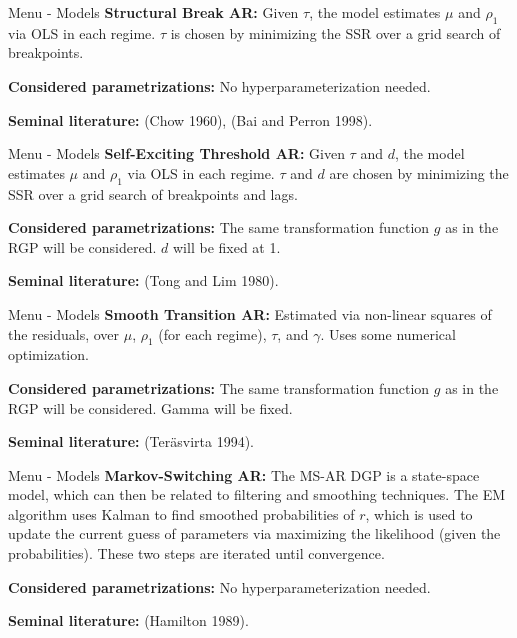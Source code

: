\documentclass[
  ignorenonframetext,
]{beamer}
\begin{document}
\begin{frame}{Menu - Models}
\label{menu---models-1}
\textbf{Structural Break AR:} Given \(\tau\), the model estimates
\(\mu\) and \(\rho_1\) via OLS in each regime. \(\tau\) is chosen by
minimizing the SSR over a grid search of breakpoints.

\textbf{Considered parametrizations:} No hyperparameterization needed.

\textbf{Seminal literature:} (Chow 1960), (Bai and Perron 1998).
\end{frame}

\begin{frame}{Menu - Models}
\label{menu---models-2}
\textbf{Self-Exciting Threshold AR:} Given \(\tau\) and \(d\), the model
estimates \(\mu\) and \(\rho_1\) via OLS in each regime. \(\tau\) and
\(d\) are chosen by minimizing the SSR over a grid search of breakpoints
and lags.

\textbf{Considered parametrizations:} The same transformation function
\(g\) as in the RGP will be considered. \(d\) will be fixed at 1.

\textbf{Seminal literature:} (Tong and Lim 1980).
\end{frame}

\begin{frame}{Menu - Models}
\label{menu---models-3}
\textbf{Smooth Transition AR:} Estimated via non-linear squares of the
residuals, over \(\mu\), \(\rho_1\) (for each regime), \(\tau\), and
\(\gamma\). Uses some numerical optimization.

\textbf{Considered parametrizations:} The same transformation function
\(g\) as in the RGP will be considered. Gamma will be fixed.

\textbf{Seminal literature:} (Teräsvirta 1994).
\end{frame}

\begin{frame}{Menu - Models}
\label{menu---models-4}
\textbf{Markov-Switching AR:} The MS-AR DGP is a state-space model,
which can then be related to filtering and smoothing techniques. The EM
algorithm uses Kalman to find smoothed probabilities of \(r\), which is
used to update the current guess of parameters via maximizing the
likelihood (given the probabilities). These two steps are iterated until
convergence.

\textbf{Considered parametrizations:} No hyperparameterization needed.

\textbf{Seminal literature:} (Hamilton 1989).
\end{frame}
\end{document}
